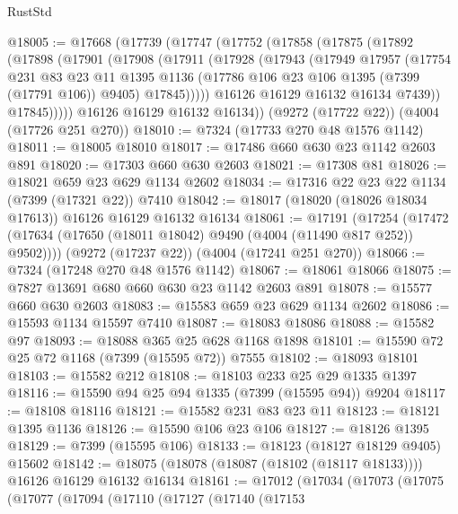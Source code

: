\begin{lexlean}{RustStd}
\begin{coremodule}
@18005 := @17668
    (@17739
      (@17747
        (@17752
          (@17858
            (@17875
              (@17892
                (@17898
                  (@17901
                    (@17908
                      (@17911
                        (@17928
                          (@17943
                            (@17949
                              @17957
                              (@17754
                                @231
                                @83
                                @23
                                @11
                                @1395
                                @1136
                                (@17786 @106 @23 @106 @1395 (@7399 (@17791 @106)) @9405)
                                @17845)))))
                      @16126
                      @16129
                      @16132
                      @16134
                      @7439))
                  @17845)))))
        @16126
        @16129
        @16132
        @16134))
    (@9272 (@17722 @22))
    (@4004 (@17726 @251 @270))
@18010 := @7324 (@17733 @270 @48 @1576 @1142)
@18011 := @18005 @18010
@18017 := @17486 @660 @630 @23 @1142 @2603 @891
@18020 := @17303 @660 @630 @2603
@18021 := @17308 @81
@18026 := @18021 @659 @23 @629 @1134 @2602
@18034 := @17316 @22 @23 @22 @1134 (@7399 (@17321 @22)) @7410
@18042 := @18017 (@18020 (@18026 @18034 @17613)) @16126 @16129 @16132 @16134
@18061 := @17191
    (@17254 (@17472 (@17634 (@17650 (@18011 @18042) @9490 (@4004 (@11490 @817 @252)) @9502))))
    (@9272 (@17237 @22))
    (@4004 (@17241 @251 @270))
@18066 := @7324 (@17248 @270 @48 @1576 @1142)
@18067 := @18061 @18066
@18075 := @7827 @13691 @680 @660 @630 @23 @1142 @2603 @891
@18078 := @15577 @660 @630 @2603
@18083 := @15583 @659 @23 @629 @1134 @2602
@18086 := @15593 @1134 @15597 @7410
@18087 := @18083 @18086
@18088 := @15582 @97
@18093 := @18088 @365 @25 @628 @1168 @1898
@18101 := @15590 @72 @25 @72 @1168 (@7399 (@15595 @72)) @7555
@18102 := @18093 @18101
@18103 := @15582 @212
@18108 := @18103 @233 @25 @29 @1335 @1397
@18116 := @15590 @94 @25 @94 @1335 (@7399 (@15595 @94)) @9204
@18117 := @18108 @18116
@18121 := @15582 @231 @83 @23 @11
@18123 := @18121 @1395 @1136
@18126 := @15590 @106 @23 @106
@18127 := @18126 @1395
@18129 := @7399 (@15595 @106)
@18133 := @18123 (@18127 @18129 @9405) @15602
@18142 := @18075 (@18078 (@18087 (@18102 (@18117 @18133)))) @16126 @16129 @16132 @16134
@18161 := @17012
    (@17034
      (@17073
        (@17075
          (@17077
            (@17094
              (@17110
                (@17127
                  (@17140
                    (@17153

\end{coremodule}
\end{lexlean}
